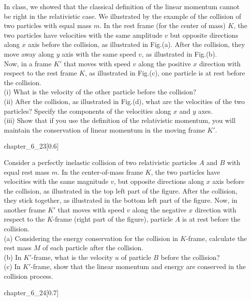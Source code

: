 \begin{example}
    In class, we showed that the classical definition of the linear
    momentum cannot be right in the relativistic case. We illustrated by the
    example of the collision of two particles with equal mass $m$. In the rest
    frame (for the center of mass) $K$, the two particles have velocities with
    the same amplitude $v$ but opposite directions along $x$ axis before the
    collision, as illustrated in Fig.(a). After the collision, they move away along $y$ axis with the same speed $v$, as illustrated in Fig.(b). \\Now, in a frame $K'$ that moves with speed $v$ along the positive $x$ direction with respect to the rest frame $K$, as illustrated in Fig.(c), one particle is at rest before the
    collision. 
    \\(i) What is the velocity of the other particle before the
    collision? 
    \\(ii) After the collision, as illustrated in Fig.(d), what are the velocities of
    the two particles? Specify the components of the velocities along $x$ and
    $y$ axes.
    \\(iii) Show that if you use the definition of the relativistic
    momentum, you will maintain the conservation of linear momentum in
    the moving frame $K'$.
	\begin{singlefigure}{chapter_6_23}[0.6]   
	\end{singlefigure}
\end{example}
\begin{example}
    Consider a perfectly inelastic collision of two relativistic particles $A$ and $B$ with equal rest mass $m$. In the center-of-mass frame $K$, the two particles have velocities with the same magnitude $v$, but opposite directions along $x$ axis before the collision, as illustrated in the top left part of the figure. After the collision, they stick together, as illustrated in the bottom left part of the figure. Now, in another frame $K'$ that moves with speed $v$ along the negative $x$ direction with respect to the $K$-frame (right part of the figure), particle $A$ is at rest before the collision.
    \\(a) Considering the energy conservation for the collision in $K$-frame, calculate the
    rest mass $M$ of each particle after the collision.
    \\(b) In $K'$-frame, what is the velocity $u$ of particle $B$ before the collision?
    \\(c) In $K'$-frame, show that the linear momentum and energy are conserved in the collision process.
    \begin{singlefigure}{chapter_6_24}[0.7]    
    \end{singlefigure}
\end{example}
